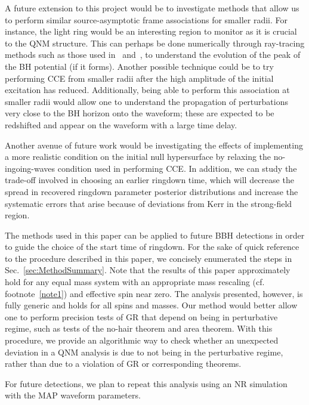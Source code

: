 A future extension to this project would be to investigate methods that allow us to perform similar source-asymptotic frame associations for smaller radii. For instance, the light ring would be an interesting region to monitor as it is crucial to the QNM structure. This can perhaps be done numerically through ray-tracing methods such as those used in~\cite{Bohn:2016afc} and~\cite{Bohn:2014xxa}, to understand the evolution of the peak of the BH potential (if it forms).  Another possible technique could be to try performing CCE from smaller radii after the high amplitude of the initial excitation has reduced. Additionally, being able to perform this association at smaller radii would allow one to understand the propagation of perturbations very close to the BH horizon onto the waveform; these are expected to be redshifted and appear on the waveform with a large time delay. 

Another avenue of future work would be investigating the effects of implementing a more realistic condition on the initial null hypersurface by relaxing the no-ingoing-waves condition used in performing CCE.  In addition, we can study the trade-off involved in choosing an earlier ringdown time, which will decrease the spread in recovered ringdown parameter posterior distributions and increase the systematic errors that arise because of deviations from Kerr in the strong-field region. %

The methods used in this paper can be applied to future BBH detections in order to guide the choice of the start time of ringdown. For the sake of quick reference to the procedure described in this paper, we concisely enumerated the steps in Sec.~\ref{sec:MethodSummary}. Note that the results of this paper approximately hold for any equal mass system with an appropriate mass rescaling (cf. footnote~\ref{note1}) and effective spin near zero. The analysis presented, however, is fully generic and holds for all spins and masses. Our method would better allow one to perform precision tests of GR that depend on being in perturbative regime, such as tests of the no-hair theorem and area theorem. With this procedure, we provide an algorithmic way to check whether an unexpected deviation in a QNM analysis is due to not being in the perturbative regime, rather than due to a violation of GR or corresponding theorems. 

For future detections, we plan to repeat this analysis using an NR simulation with the MAP waveform parameters. 


